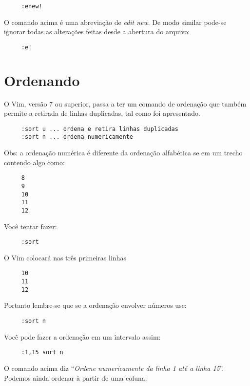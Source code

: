 \begin{verbatim}
     :enew!
\end{verbatim}

O comando acima é uma abreviação de {\em edit new}. De modo similar pode-se
ignorar todas as alterações feitas desde a abertura do arquivo:

\begin{verbatim}
     :e!
\end{verbatim}

\section{Ordenando}

O Vim, versão 7 ou superior, passa a ter um comando de ordenação que também 
permite a retirada de linhas duplicadas, tal como foi apresentado.

\begin{verbatim}
     :sort u ... ordena e retira linhas duplicadas
     :sort n ... ordena numericamente
\end{verbatim}

Obs: a ordenação numérica é diferente da ordenação alfabética se em um
trecho contendo algo como:

\begin{verbatim}
     8
     9
     10
     11
     12
\end{verbatim}

Você tentar fazer:

\begin{verbatim}
     :sort
\end{verbatim}

O Vim colocará nas três primeiras linhas

\begin{verbatim}
     10
     11
     12
\end{verbatim}

Portanto lembre-se que se a ordenação envolver números use:

\begin{verbatim}
     :sort n
\end{verbatim}

Você pode fazer a ordenação em um intervalo assim:

\begin{verbatim}
     :1,15 sort n
\end{verbatim}

O comando acima diz ``{\em Ordene numericamente da linha 1 até a linha 15}''.  
Podemos ainda ordenar à partir de uma coluna:

